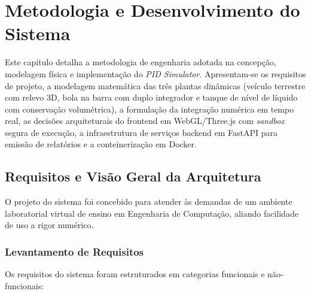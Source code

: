 \chapter{Metodologia e Desenvolvimento do Sistema}
\label{cap:metodologia}

Este capítulo detalha a metodologia de engenharia adotada na concepção, modelagem física e implementação do \textit{PID Simulator}. Apresentam-se os requisitos de projeto, a modelagem matemática das três plantas dinâmicas (veículo terrestre com relevo 3D, bola na barra com duplo integrador e tanque de nível de líquido com conservação volumétrica), a formulação da integração numérica em tempo real, as decisões arquiteturais do frontend em WebGL/Three.js com \textit{sandbox} segura de execução, a infraestrutura de serviços backend em FastAPI para emissão de relatórios e a conteinerização em Docker.

\section{Requisitos e Visão Geral da Arquitetura}
\label{sec:requisitos_arquitetura}

O projeto do sistema foi concebido para atender às demandas de um ambiente laboratorial virtual de ensino em Engenharia de Computação, aliando facilidade de uso a rigor numérico.

\subsection{Levantamento de Requisitos}
\label{subsec:levantamento_requisitos}

Os requisitos do sistema foram estruturados em categorias funcionais e não-funcionais:

